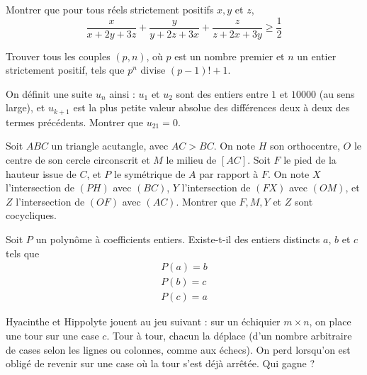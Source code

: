 \begin{exo}{}
Montrer que pour tous réels strictement positifs $x,y$ et $z$,
\[\frac{x}{x+2y+3z}+\frac{y}{y+2z+3x}+\frac{z}{z+2x+3y}\geq \frac{1}{2}\]
\end{exo}

\begin{exo}{}
Trouver tous les couples $(p,n)$, où $p$ est  un nombre premier et $n$ un entier strictement positif, tels que $p^n$ divise $(p-1)! +1$.
\end{exo}

\begin{exo}{}On définit une suite $u_{n}$ ainsi : $u_{1}$ et $u_{2}$ sont des entiers entre $1$ et $10000$ (au sens large), et $u_{k+1}$
est la plus petite valeur absolue des différences deux à deux des termes précédents. Montrer que
$u_{21} = 0$.
\end{exo}

\begin{exo}{} Soit $ABC$ un triangle acutangle, avec $AC > BC$. On note $H$ son orthocentre, $O$ le centre de son cercle circonscrit et $M$ le milieu de $[AC]$. Soit $F$ le pied de la hauteur issue de $C$, et $P$ le symétrique de $A$ par rapport à $F$. On note $X$ l'intersection de $(PH)$ avec $(BC)$, $Y$ l'intersection de $(FX)$ avec $(OM)$, et $Z$ l'intersection de $(OF)$ avec $(AC)$. Montrer que $F, M, Y$ et $Z$ sont cocycliques.

\end{exo}

\begin{exo}{}Soit $P$ un polynôme à coefficients entiers. Existe-t-il des entiers distincts $a$, $b$ et $c$ tels que
\begin{align*}
P(a)=b\\
P(b)=c\\
P(c)=a
\end{align*}
\end{exo}


\begin{exo}{}Hyacinthe et Hippolyte jouent au jeu suivant : sur un échiquier $m \times n$, on place une tour sur
une case $c$. Tour à tour, chacun la déplace (d’un nombre arbitraire de cases selon les lignes ou
colonnes, comme aux échecs). On perd lorsqu’on est obligé de revenir sur une case où la tour
s’est déjà arrêtée. Qui gagne ?
\end{exo}

